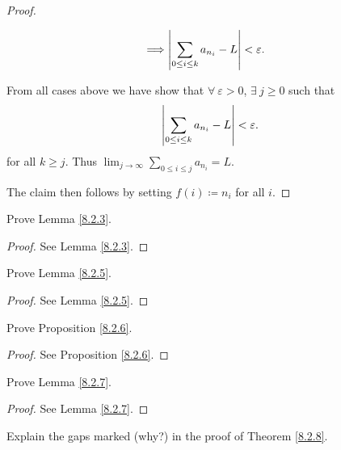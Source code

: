 \begin{proof}
\begin{enumerate}
\begin{enumerate}[label=(\Roman*)]
\begin{align*}
                            \implies & \abs*{\sum_{0 \leq i \leq k} a_{n_i} - L} < \varepsilon.
                        \end{align*}
              \end{enumerate}
              From all cases above we have show that \(\forall\ \varepsilon > 0\), \(\exists\ j \geq 0\) such that
              \[
                  \abs*{\sum_{0 \leq i \leq k} a_{n_i} - L} < \varepsilon.
              \]
              for all \(k \geq j\).
              Thus \(\lim_{j \to \infty} \sum_{0 \leq i \leq j} a_{n_i} = L\).
    \end{enumerate}
    The claim then follows by setting \(f(i) \coloneqq n_i\) for all \(i\).
\end{proof}

\exercisesection

\begin{exercise}\label{ex 8.2.1}
    Prove Lemma \ref{8.2.3}.
\end{exercise}

\begin{proof}
    See Lemma \ref{8.2.3}.
\end{proof}

\begin{exercise}\label{ex 8.2.2}
    Prove Lemma \ref{8.2.5}.
\end{exercise}

\begin{proof}
    See Lemma \ref{8.2.5}.
\end{proof}

\begin{exercise}\label{ex 8.2.3}
    Prove Proposition \ref{8.2.6}.
\end{exercise}

\begin{proof}
    See Proposition \ref{8.2.6}.
\end{proof}

\begin{exercise}\label{ex 8.2.4}
    Prove Lemma \ref{8.2.7}.
\end{exercise}

\begin{proof}
    See Lemma \ref{8.2.7}.
\end{proof}

\begin{exercise}\label{ex 8.2.5}
    Explain the gaps marked (why?) in the proof of Theorem \ref{8.2.8}.
\end{exercise}

